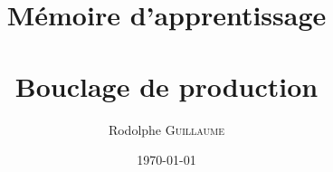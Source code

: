 \title{
    Mémoire d'apprentissage\\
    \entreprise\\
    Bouclage de production
}

\author{
    Rodolphe \textsc{Guillaume} \\
}

\date{\today}


\usepackage{fancyhdr}
\pagestyle{fancy}
\fancyhf{}
\lhead{\tnp}
\cfoot{\thepage}